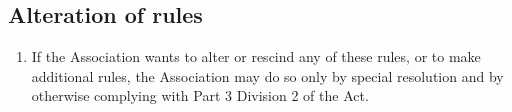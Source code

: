 \documentclass[../constitution.tex]{subfiles}
\begin{document}
\hypertarget{alteration-of-rules}{%
\subsection{Alteration of rules}\label{alteration-of-rules}}

\begin{enumerate}

\item If the Association wants to alter or rescind any of these rules, or to make additional rules, the Association may do so only by special resolution and by otherwise complying with Part 3 Division 2 of the Act.
\end{enumerate}
\end{document}
